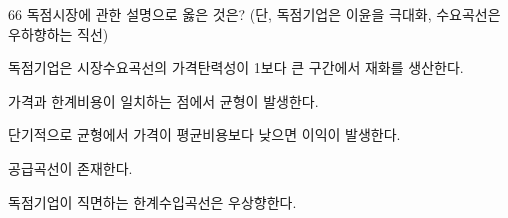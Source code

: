 \begin{question}{66}
독점시장에 관한 설명으로 옳은 것은? (단, 독점기업은 이윤을 극대화, 수요곡선은 우하향하는 직선)
\begin{choices}
  \item 독점기업은 시장수요곡선의 가격탄력성이 1보다 큰 구간에서 재화를 생산한다.
  \item 가격과 한계비용이 일치하는 점에서 균형이 발생한다.
  \item 단기적으로 균형에서 가격이 평균비용보다 낮으면 이익이 발생한다.
  \item 공급곡선이 존재한다.
  \item 독점기업이 직면하는 한계수입곡선은 우상향한다.
\end{choices}
\end{question}
